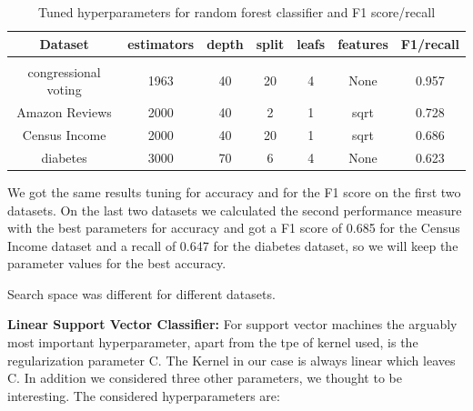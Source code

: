 \documentclass[a4paper,10pt]{article}
\begin{document}
\begin{table}[h!]
    \centering
    \begin{tabular}{|c|c|c|c|c|c|c|}
    \hline
    Dataset & \textsf{estimators} & \textsf{depth} & \textsf{split} & \textsf{leafs} & \textsf{features} & F1/recall \\
    \hline
    \multicolumn{7}{c}{\vspace{-0.4cm}} \\ %
    \hline
    congressional voting & 1963 & 40 & 20 & 4 & None & 0.957 \\%
    \hline
    Amazon Reviews & 2000 & 40 & 2 & 1 & sqrt & 0.728 \\%
    \hline
    Census Income & 2000 & 40 & 20 & 1 & sqrt & 0.686 \\%
    \hline
    diabetes & 3000 & 70 & 6 & 4 & None & 0.623 \\%
    \hline
    \end{tabular}
    \caption{Tuned hyperparameters for random forest classifier and F1 score/recall} 
    \label{table:tu_hyp_rf_f1}
    \end{table}

We got the same results tuning for accuracy and for the F1 score on the first two datasets. On the last two datasets we calculated the second performance measure with the best parameters for accuracy and got a F1 score of 0.685 for the Census Income dataset and a recall of 0.647 for the diabetes dataset, so we will keep the parameter values for the best accuracy.

Search space was different for different datasets.


\textbf{Linear Support Vector Classifier:} For support vector machines the arguably most important hyperparameter, apart from the tpe of kernel used, is the regularization parameter \textsf{C}. The Kernel in our case is always linear which leaves \textsf{C}. In addition we considered three other parameters, we thought to be interesting. The considered hyperparameters are:
\end{document}
